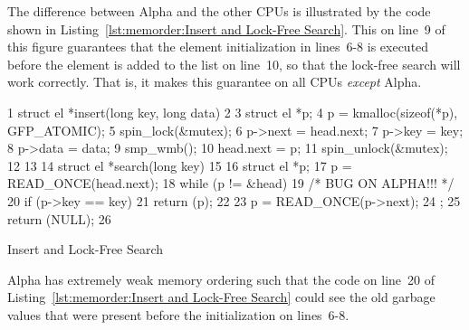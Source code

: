 The difference between Alpha and the other CPUs is illustrated by the
code shown in
Listing~\ref{lst:memorder:Insert and Lock-Free Search}.
This  on line~9 of this figure
guarantees that the element initialization
in lines~6-8 is executed before the element is added to the
list on line~10, so that the lock-free search will work correctly.
That is, it makes this guarantee on all CPUs {\em except} Alpha.

\begin{listing}[tbp]
{ \scriptsize
\begin{verbbox}
  1 struct el *insert(long key, long data)
  2 {
  3     struct el *p;
  4     p = kmalloc(sizeof(*p), GFP_ATOMIC);
  5     spin_lock(&mutex);
  6     p->next = head.next;
  7     p->key = key;
  8     p->data = data;
  9     smp_wmb();
 10     head.next = p;
 11     spin_unlock(&mutex);
 12 }
 13
 14 struct el *search(long key)
 15 {
 16     struct el *p;
 17     p = READ_ONCE(head.next);
 18     while (p != &head) {
 19         /* BUG ON ALPHA!!! */
 20         if (p->key == key) {
 21             return (p);
 22         }
 23         p = READ_ONCE(p->next);
 24     };
 25     return (NULL);
 26 }
\end{verbbox}
}
\centering
\theverbbox
\caption{Insert and Lock-Free Search}
\label{lst:memorder:Insert and Lock-Free Search}
\end{listing}

Alpha has extremely weak memory ordering
such that the code on line~20 of
Listing~\ref{lst:memorder:Insert and Lock-Free Search} could see the old
garbage values that were present before the initialization on lines~6-8.

